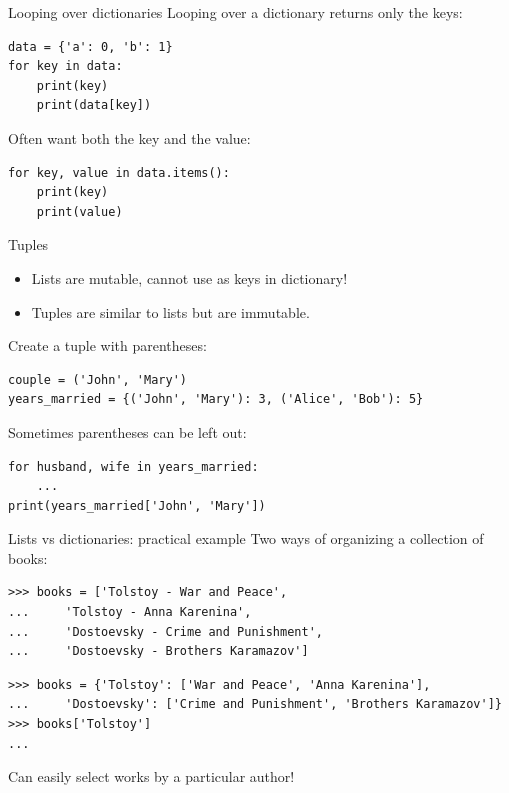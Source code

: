 \documentclass[aspectratio=169,usenames,dvipsnames]{beamer}
\begin{document}
\begin{frame}[fragile]{Looping over dictionaries}
Looping over a dictionary returns only the keys:
\begin{lstlisting}
data = {'a': 0, 'b': 1}
for key in data:
    print(key)
    print(data[key])
\end{lstlisting}

\pause
Often want both the key and the value:
\begin{lstlisting}
for key, value in data.items():
    print(key)
    print(value)
\end{lstlisting}
\end{frame}

\begin{frame}[fragile]{Tuples}
    \begin{itemize}
        \item Lists are mutable, cannot use as keys in dictionary!
        \item Tuples are similar to lists but are immutable.
    \end{itemize}
Create a tuple with parentheses:

\begin{lstlisting}
couple = ('John', 'Mary')
years_married = {('John', 'Mary'): 3, ('Alice', 'Bob'): 5}
\end{lstlisting}

\pause
Sometimes parentheses can be left out:
\begin{lstlisting}
for husband, wife in years_married:
    ...
print(years_married['John', 'Mary'])
\end{lstlisting}
\end{frame}

\begin{frame}[fragile]{Lists vs dictionaries: practical example}
Two ways of organizing a collection of books:
\begin{lstlisting}
>>> books = ['Tolstoy - War and Peace',
...     'Tolstoy - Anna Karenina',
...     'Dostoevsky - Crime and Punishment',
...     'Dostoevsky - Brothers Karamazov']
\end{lstlisting}

\pause
\begin{lstlisting}
>>> books = {'Tolstoy': ['War and Peace', 'Anna Karenina'],
...     'Dostoevsky': ['Crime and Punishment', 'Brothers Karamazov']}
>>> books['Tolstoy']
...
\end{lstlisting}
Can easily select works by a particular author!
\end{frame}
\end{document}
